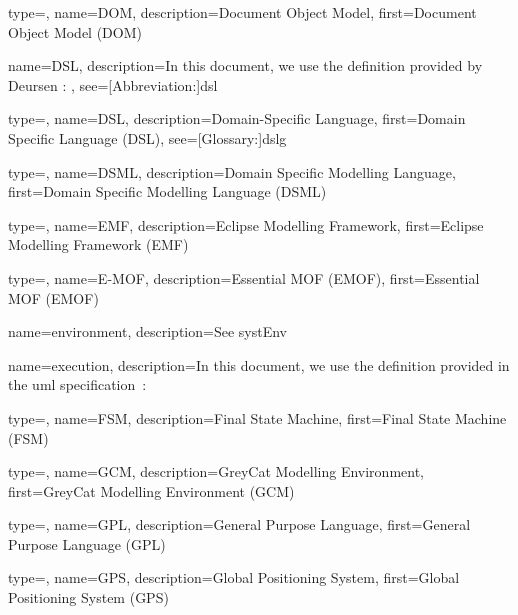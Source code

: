 {
	type=\acronymtype,
	name={DOM},
	description={Document Object Model},
	first={Document Object Model (DOM)}
}

{
	name={DSL},
	description={In this document, we use the definition provided by Deursen \etal \cite{DBLP:journals/sigplan/DeursenKV00}: },
	see=[Abbreviation:]{dsl}
}

{
	type=\acronymtype,
	name={DSL},
	description={Domain-Specific Language},
	first={Domain Specific Language (DSL)},
	see=[Glossary:]{dslg}
}

{
	type=\acronymtype,
	name={DSML},
	description={Domain Specific Modelling Language},
	first={Domain Specific Modelling Language (DSML)}
}

{
	type=\acronymtype,
	name={EMF},
	description={Eclipse Modelling Framework},
	first={Eclipse Modelling Framework (EMF)}
}

{
	type=\acronymtype,
	name={E-MOF},
	description={Essential MOF (EMOF)},
	first={Essential MOF (EMOF)}
}

{
	name={envi\-ron\-ment},
	description={See \gls{systEnv}}
}

{
	name={exe\-cu\-tion},
	description={In this document, we use the definition provided in the \gls{uml} specification~\cite{omg2017umlspec}: }
}

{
	type=\acronymtype,
	name={FSM},
	description={Final State Machine},
	first={Final State Machine (FSM)}
}

{
	type=\acronymtype,
	name={GCM},
	description={GreyCat Modelling Environment},
	first={GreyCat Modelling Environment (GCM)}
}

{
	type=\acronymtype,
	name={GPL},
	description={General Purpose Language},
	first={General Purpose Language (GPL)}
}

{
	type=\acronymtype,
	name={GPS},
	description={Global Positioning System},
	first={Global Positioning System (GPS)}
}

